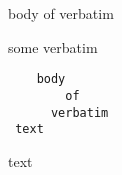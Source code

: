 \begin{myenv}
body of verbatim
\end{myenv}
some verbatim
\begin{verbatim}
    body
        of
      verbatim
 text
\end{verbatim}
text
